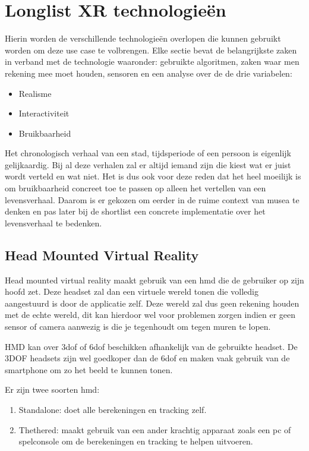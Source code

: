 \chapter{Longlist XR technologieën}
\label{ch:longlist}

Hierin worden de verschillende technologieën overlopen die kunnen gebruikt worden om deze use case te volbrengen.
Elke sectie bevat de belangrijkste zaken in verband met de technologie waaronder: gebruikte algoritmen, zaken waar men rekening mee moet houden, sensoren en een analyse over de de drie variabelen:

\begin{itemize}
    \item Realisme
    \item Interactiviteit
    \item Bruikbaarheid
\end{itemize}

Het chronologisch verhaal van een stad, tijdsperiode of een persoon is eigenlijk gelijkaardig. Bij al deze verhalen zal er altijd iemand zijn die kiest wat er juist wordt verteld en wat niet. Het is dus ook voor deze reden dat het heel moeilijk is om bruikbaarheid concreet toe te passen op alleen het vertellen van een levensverhaal. Daarom is er gekozen om eerder in de ruime context van musea te denken en pas later bij de shortlist een concrete implementatie over het levensverhaal te bedenken. 

\section{Head Mounted Virtual Reality}
Head mounted virtual reality maakt gebruik van een \acrshort{hmd} die de gebruiker op zijn hoofd zet. Deze headset zal dan een virtuele wereld tonen die volledig aangestuurd is door de applicatie zelf. Deze wereld zal dus geen rekening houden met de echte wereld, dit kan hierdoor wel voor problemen zorgen indien er geen sensor of camera aanwezig is die je tegenhoudt om tegen muren te lopen.

HMD kan over \acrshort{3dof} of \acrshort{6dof} beschikken afhankelijk van de gebruikte headset. De 3DOF headsets zijn wel goedkoper dan de \acrshort{6dof} en maken vaak gebruik van de smartphone om zo het beeld te kunnen tonen. 

Er zijn twee soorten \acrshort{hmd}:
\begin{enumerate}
    \item Standalone: doet alle berekeningen en tracking zelf.
    \item Thethered: maakt gebruik van een ander krachtig apparaat zoals een pc of spelconsole om de berekeningen en tracking te helpen uitvoeren.
\end{enumerate}

